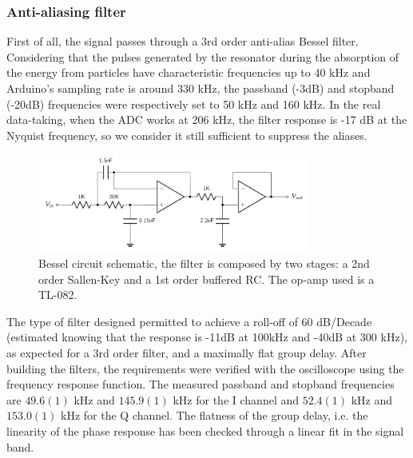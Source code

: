 \documentclass[12pt]{article}
\begin{document}
\subsubsection{Anti-aliasing filter}
First of all, the signal passes through a 3rd order anti-alias Bessel filter. Considering that the pulses generated by the resonator during the absorption of the energy from particles have characteristic frequencies up to 40 kHz and Arduino's sampling rate is around 330 kHz, the passband (-3dB) and stopband (-20dB) frequencies were respectively set to 50 kHz and 160 kHz. In the real data-taking, when the ADC works at 206 kHz, the filter response is -17 dB at the Nyquist frequency, so we consider it still sufficient to suppress the aliases.
    \begin{figure}[H]
        \centering
        \includegraphics[width=0.8\textwidth]{bessel.PNG}
        \caption{Bessel circuit schematic, the filter is composed by two stages: a 2nd order Sallen-Key and a 1st order buffered RC. The op-amp used is a TL-082.}
        \label{bessel}
    \end{figure}
The type of filter designed permitted to achieve a roll-off of 60 dB/Decade (estimated knowing that the response is -11dB at 100kHz and -40dB at 300 kHz), as expected for a 3rd order filter, and a maximally flat group delay.
After building the filters, the requirements were verified with the oscilloscope using the frequency response function. The measured passband and stopband frequencies are $49.6(1)$ kHz and $145.9(1)$ kHz for the I channel and $52.4(1)$ kHz and $153.0(1)$ kHz for the Q channel. The flatness of the group delay, i.e. the linearity of the phase response has been checked through a linear fit in the signal band.
\end{document}
